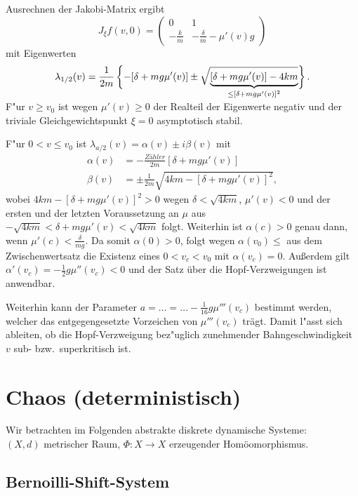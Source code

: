 \documentclass[a4paper, 13pt]{scrreprt}
\theoremstyle{definition} \newtheorem{definition}{Definition}[section]
\newenvironment{beispiel}[1][Beispiel]{\begin{trivlist}
\item[\hskip \labelsep {\bfseries #1}]}{\end{trivlist}}
\begin{document}
\begin{beispiel}[Reibschwinger aus der Mechanik]
Ausrechnen der Jakobi-Matrix ergibt
\[
J_\xi f(v,0)=\begin{pmatrix}
0 & 1\\
-\frac{k}{m} & -\frac{\delta}{m}-\mu'(v)g
\end{pmatrix}
\]
mit Eigenwerten
\[
\lambda_{1\slash2}(v)=\frac{1}{2m}\left\{-[\delta+mg\mu'(v)]\pm\sqrt{\vphantom{[\delta+mg\mu'(v)]-4km}\smash{\underbrace{[\delta+mg\mu'(v)]-4km}_{\leq[\delta+mg\mu'(v)]^2}}}\right\}.
\]

F"ur $v\geq v_0$ ist wegen $\mu'(v)\geq0$ der Realteil der Eigenwerte negativ und der triviale Gleichgewichtspunkt $\xi=0$ asymptotisch stabil.

F"ur $0<v\leq v_0$ ist $\lambda_{a\slash 2}(v)=\alpha(v)\pm i\beta(v)$ mit
\begin{align*}
\alpha(v)&=-\frac{Zähler}{2m}[\delta+mg\mu'(v)]\\
\beta(v)&=\pm\frac{1}{2m}\sqrt{4km-[\delta+mg\mu'(v)]^2},
\end{align*}
wobei $4km-[\delta+mg\mu'(v)]^2>0$ wegen $\delta<\sqrt{4km}$, $\mu'(v)<0$ und der ersten und der letzten Voraussetzung an $\mu$ aus $-\sqrt{4km}<\delta+mg\mu'(v)<\sqrt{4km}$ folgt. Weiterhin ist $\alpha(c)>0$ genau dann, wenn $\mu'(c)<\frac{\delta}{mg}$. Da somit $\alpha(0)>0$, folgt wegen $\alpha(v_0)\leq$ aus dem Zwischenwertsatz die Existenz eines $0<v_c<v_0$ mit $\alpha(v_c)=0$. Außerdem gilt $\alpha'(v_c)=-\frac{1}{2}g\mu''(v_c)<0$ und der Satz über die Hopf-Verzweigungen ist anwendbar.

Weiterhin kann der Parameter $a=\ldots=\ldots-\frac{1}{16}g\mu'''(v_c)$ bestimmt werden, welcher das entgegengesetzte Vorzeichen von $\mu'''(v_c)$ trägt. Damit l"asst sich ableiten, ob die Hopf-Verzweigung bez"uglich zunehmender Bahngeschwindigkeit $v$ sub- bzw.\ superkritisch ist. 
\end{beispiel}


\chapter{Chaos (deterministisch)}

Wir betrachten im Folgenden abstrakte diskrete dynamische Systeme:\\
\((X,d)\) metrischer Raum, \(\Phi:X\to X \) erzeugender Homöomorphismus.

\section{Bernoilli-Shift-System}
\end{document}
